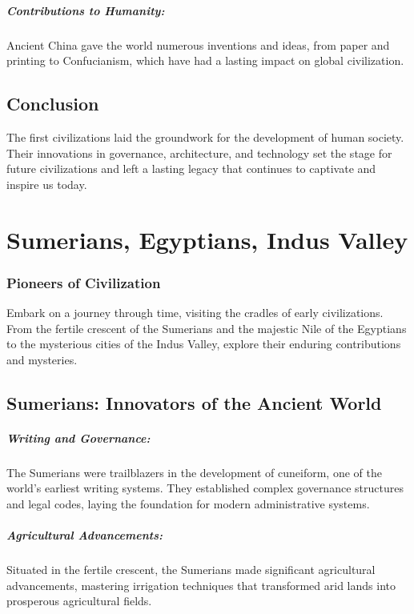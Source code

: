 \documentclass[a4paper,12pt]{book}
\begin{document}
\paragraph{Contributions to Humanity:}
Ancient China gave the world numerous inventions and ideas, from paper and printing to Confucianism, which have had a lasting impact on global civilization.

\section*{Conclusion}

The first civilizations laid the groundwork for the development of human society. Their innovations in governance, architecture, and technology set the stage for future civilizations and left a lasting legacy that continues to captivate and inspire us today.

\chapter{Sumerians, Egyptians, Indus Valley}
\subsection*{Pioneers of Civilization}
Embark on a journey through time, visiting the cradles of early civilizations. From the fertile crescent of the Sumerians and the majestic Nile of the Egyptians to the mysterious cities of the Indus Valley, explore their enduring contributions and mysteries.

\section*{Sumerians: Innovators of the Ancient World}

\paragraph{Writing and Governance:}
The Sumerians were trailblazers in the development of cuneiform, one of the world's earliest writing systems. They established complex governance structures and legal codes, laying the foundation for modern administrative systems.

\paragraph{Agricultural Advancements:}
Situated in the fertile crescent, the Sumerians made significant agricultural advancements, mastering irrigation techniques that transformed arid lands into prosperous agricultural fields.
\end{document}
